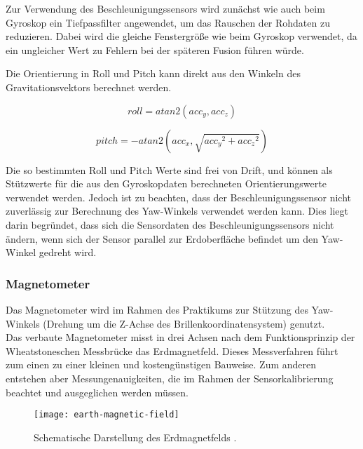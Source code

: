 Zur Verwendung des Beschleunigungssensors wird zunächst wie auch beim
Gyroskop ein Tiefpassfilter angewendet, um das Rauschen der Rohdaten zu
reduzieren. Dabei wird die gleiche Fenstergröße wie beim Gyroskop
verwendet, da ein ungleicher Wert zu Fehlern bei der späteren Fusion
führen würde. 


Die Orientierung in Roll und Pitch kann direkt aus den Winkeln des Gravitationsvektors berechnet werden.

\begin{equation}
    roll = atan2(acc_y, acc_z)
\end{equation}

\begin{equation}
    pitch = -atan2(acc_x, \sqrt{ {acc_y}^2 + {acc_z}^2 })
\end{equation}

Die so bestimmten Roll und Pitch Werte sind frei von Drift, und können als Stützwerte für die aus den Gyroskopdaten berechneten Orientierungswerte verwendet werden. Jedoch ist zu beachten, dass der Beschleunigungssensor nicht zuverlässig zur Berechnung des Yaw-Winkels verwendet werden kann. Dies liegt darin begründet, dass sich die Sensordaten des Beschleunigungssensors nicht ändern, wenn sich der Sensor parallel zur Erdoberfläche befindet um den Yaw-Winkel gedreht wird.



\subsubsection{Magnetometer}
\label{headtracking_magnetometer_subsubsec}
Das Magnetometer wird im Rahmen des Praktikums zur Stützung des Yaw-Winkels (Drehung um die Z-Achse des Brillenkoordinatensystem) genutzt.\\
Das verbaute Magnetometer misst in drei Achsen nach dem Funktionsprinzip der Wheatstoneschen Messbrücke \cite{renaudin2010complete} das Erdmagnetfeld.
Dieses Messverfahren führt zum einen zu einer kleinen und kostengünstigen Bauweise.
Zum anderen entstehen aber Messungenauigkeiten, die im Rahmen der Sensorkalibrierung beachtet und ausgeglichen werden müssen.

\begin{figure}
   \centering
   \texttt{[image: earth-magnetic-field]}
   \caption[mag_world]{Schematische Darstellung des Erdmagnetfelds \cite{mag_world_source}.}
   \label{fig:mag_world}
\end{figure}

